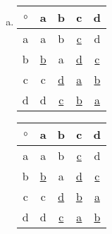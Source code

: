 \begin{multicols}{2}
\begin{enumerate}[(a)]
\item
\begin{center}
		\begin{tabular}{c| c c c c }
			$\circ$ & a & b & c & d\\
			\hline
			a & a & b &\underline{c} & d\\
			b & \underline{b} & a & \underline{d} & \underline{c}\\	
			c & c & \underline{d} & \underline{a} & \underline{b}\\
			d & d & \underline{c} & \underline{b} & \underline{a}
		\end{tabular}
	\end{center}

	\begin{center}
		\begin{tabular}{c| c c c c }
			$\circ$ & a & b & c & d\\
			\hline
			a & a & b &\underline{c} & d\\
			b & \underline{b} & a & \underline{d} & \underline{c}\\	
			c & c & \underline{d} & \underline{b} & \underline{a}\\
			d & d & \underline{c} & \underline{a} & \underline{b}
		\end{tabular}
	\end{center}

\end{enumerate}
\end{multicols}

